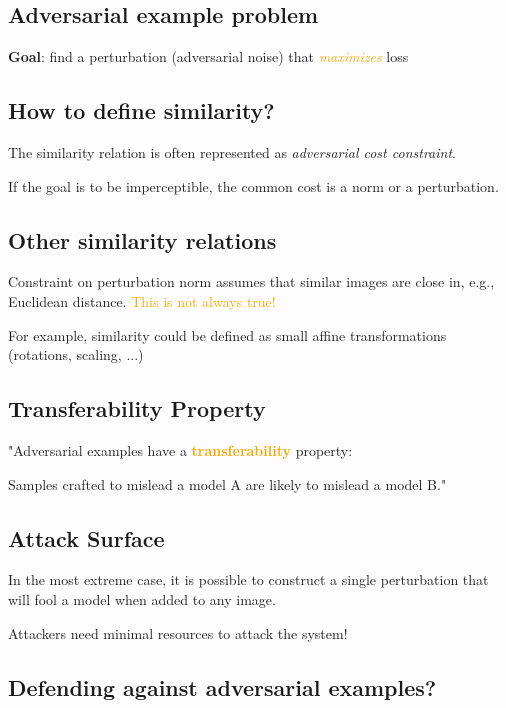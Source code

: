 \documentclass[11pt]{article}
\begin{document}
\subsection*{Adversarial example problem}

\textbf{Goal}: find a perturbation (adversarial noise) that \textit{\textcolor{orange}{maximizes}} loss

\subsection*{How to define similarity?}

The similarity relation is often represented as \textit{adversarial cost constraint}. 

If the goal is to be imperceptible, the common cost is a norm or a perturbation.

\subsection*{Other similarity relations}

Constraint on perturbation norm assumes that similar images are close in, e.g., Euclidean distance. \textcolor{orange}{This is not always true!}

For example, similarity could be defined as small affine transformations (rotations, scaling, ...)  

\subsection*{Transferability Property}

"Adversarial examples have a \textbf{\textcolor{orange}{transferability}} property: 

Samples crafted to mislead a model A are likely to mislead a model B."

\subsection*{Attack Surface}

In the most extreme case, it is possible to construct a single perturbation that will fool a model when added to any image. 

Attackers need minimal resources to attack the system! 

\subsection*{Defending against adversarial examples?}
\end{document}
